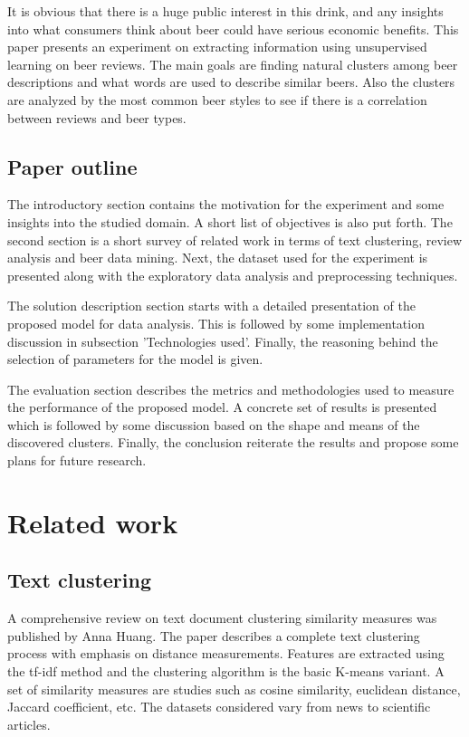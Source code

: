 \documentclass[12pt]{article}
\begin{document}
	It is obvious that there is a huge public interest in this drink, and any insights into what consumers think about beer could have serious economic benefits. This paper presents an experiment on extracting information using unsupervised learning on beer reviews. The main goals are finding natural clusters among beer descriptions and what words are used to describe similar beers. Also the clusters are analyzed by the most common beer styles to see if there is a correlation between reviews and beer types.
	
	\subsection{Paper outline}
	The introductory section contains the motivation for the experiment and some insights into the studied domain. A short list of objectives is also put forth. The second section is a short survey of related work in terms of text clustering, review analysis and beer data mining. Next, the dataset used for the experiment is presented along with the exploratory data analysis and preprocessing techniques.
	
	The solution description section starts with a detailed presentation of the proposed model for data analysis. This is followed by some implementation discussion in subsection 'Technologies used'. Finally, the reasoning behind the selection of parameters for the model is given.
	
	The evaluation section describes the metrics and methodologies used to measure the performance of the proposed model. A concrete set of results is presented which is followed by some discussion based on the shape and means of the discovered clusters. Finally, the conclusion reiterate the results and propose some plans for future research.
	
	\section{Related work}
	
	\subsection{Text clustering}
	A comprehensive review on text document clustering similarity measures was published by Anna Huang\cite{TextClustering}. The paper describes a complete text clustering process with emphasis on distance measurements. Features are extracted using the tf-idf method and the clustering algorithm is the basic K-means variant. A set of similarity measures are studies such as cosine similarity, euclidean distance, Jaccard coefficient, etc. The datasets considered vary from news to scientific articles.
	
\end{document}
